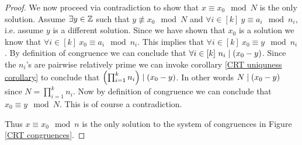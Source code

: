 \begin{proof}
            We now proceed via contradiction to show that $x \equiv x_0 \mod N$ is the only solution.
            Assume $\exists y \in \mathbb{Z}$ such that $y \not\equiv x_0 \mod N$ and 
            $\forall i \in [k] \ y \equiv a_i \mod n_i$, i.e. assume $y$ is a different solution. 
            Since we have shown that $x_0$
            is a solution we know that $\forall i \in [k] \ x_0 \equiv a_i \mod n_i$.
            This implies that $\forall i \in [k] \ x_0 \equiv y \mod n_i$. By definition
            of congruence we can conclude that $\forall i \in [k] \ n_i \mid (x_0 - y)$.
            Since the $n_i$'s are pairwise relatively prime we can invoke corollary
            \ref{CRT uniquness corollary} to conclude that
            $\left(\prod_{i = 1}^{k} n_i\right) \mid (x_0 - y)$.
            In other words $N \mid (x_0 - y)$ since $N = \prod_{i = 1}^{k} n_i$.
            Now by definition of congruence we can conclude that $x_0 \equiv y \mod N$.
            This is of course a contradiction.

            Thus $x \equiv x_0 \mod n$ is the only solution to
            the system of congruences in Figure \ref{CRT congruences}. \QED
        \end{proof}
